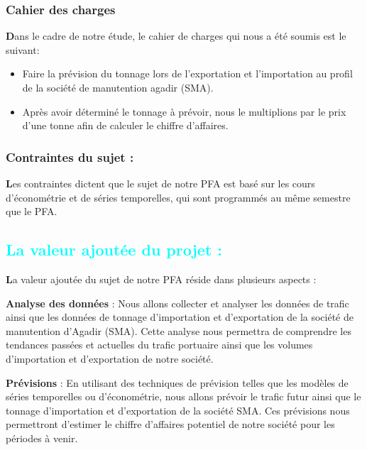 \documentclass[11pt]{article}
\begin{document}
\subsubsection{Cahier des charges}
\textbf{D}ans le cadre de notre étude, le cahier de charges qui nous a été soumis est le suivant:
\begin{itemize}
   

 \item Faire la prévision du tonnage lors de l’exportation et l’importation au profil de la société de manutention agadir   (SMA).

 \item Après avoir déterminé le tonnage à prévoir, nous le multiplions par le prix d'une tonne afin de calculer le chiffre d'affaires.
\end{itemize}

\subsubsection{Contraintes du sujet :}
\textbf{L}es contraintes dictent que le sujet de notre PFA est basé sur les cours d'économétrie et de séries temporelles, qui sont programmés au même semestre que le PFA.






\subsection{\textcolor{cyan}{La valeur ajoutée du projet :}} 


\textbf{L}a valeur ajoutée du sujet de notre PFA réside dans plusieurs aspects : \vspace{0.5cm}

\textbf{Analyse des données} : Nous allons collecter et analyser les données de trafic ainsi que les données de tonnage d'importation et d'exportation de la société de manutention d'Agadir (SMA). Cette analyse nous permettra de comprendre les tendances passées et actuelles du trafic portuaire ainsi que les volumes d'importation et d'exportation de notre société.

\textbf{Prévisions} : En utilisant des techniques de prévision telles que les modèles de séries temporelles ou d'économétrie, nous allons prévoir le trafic futur ainsi que le tonnage d'importation et d'exportation de la société SMA. Ces prévisions nous permettront d'estimer le chiffre d'affaires potentiel de notre société pour les périodes à venir.
\end{document}
